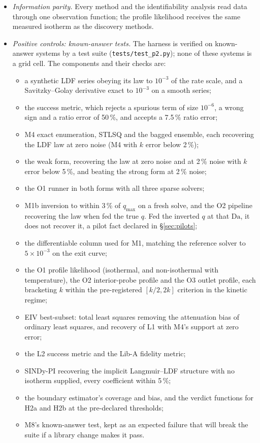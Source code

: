 \documentclass[11pt]{article}
\newcommand{\Da}{\mathrm{Da}}
\begin{document}
\begin{itemize}
\item \emph{Information parity.} Every method and the identifiability analysis read data
through one observation function; the profile likelihood receives the same measured
isotherm as the discovery methods.
\item \emph{Positive controls: known-answer tests.} The harness is verified on known-answer
systems by a test suite (\texttt{tests/test\_p2.py}); none of these systems is a grid cell.
The components and their checks are:
\begin{itemize}
\item a synthetic LDF series obeying its law to $10^{-3}$ of the rate scale, and a
Savitzky--Golay derivative exact to $10^{-3}$ on a smooth series;
\item the success metric, which rejects a spurious term of size $10^{-6}$, a wrong sign and
a ratio error of 50\,\%, and accepts a 7.5\,\% ratio error;
\item M4 exact enumeration, STLSQ and the bagged ensemble, each recovering the LDF law at
zero noise (M4 with $k$ error below 2\,\%);
\item the weak form, recovering the law at zero noise and at 2\,\% noise with $k$ error
below 5\,\%, and beating the strong form at 2\,\% noise;
\item the O1 runner in both forms with all three sparse solvers;
\item M1b inversion to within 3\,\% of $q_{\max}$ on a fresh solve, and the O2 pipeline
recovering the law when fed the true $q$. Fed the inverted $q$ at that $\Da$, it does not
recover it, a pilot fact declared in \S\ref{sec:pilots};
\item the differentiable column used for M1, matching the reference solver to
$5\times10^{-3}$ on the exit curve;
\item the O1 profile likelihood (isothermal, and non-isothermal with temperature), the O2
interior-probe profile and the O3 outlet profile, each bracketing $k$ within the
pre-registered $[k/2, 2k]$ criterion in the kinetic regime;
\item EIV best-subset: total least squares removing the attenuation bias of ordinary least
squares, and recovery of L1 with M4's support at zero error;
\item the L2 success metric and the Lib-A fidelity metric;
\item SINDy-PI recovering the implicit Langmuir--LDF structure with no isotherm supplied,
every coefficient within 5\,\%;
\item the boundary estimator's coverage and bias, and the verdict functions for H2a and
H2b at the pre-declared thresholds;
\item M8's known-answer test, kept as an expected failure that will break the suite if a
library change makes it pass.
\end{itemize}
\end{itemize}
\end{document}
